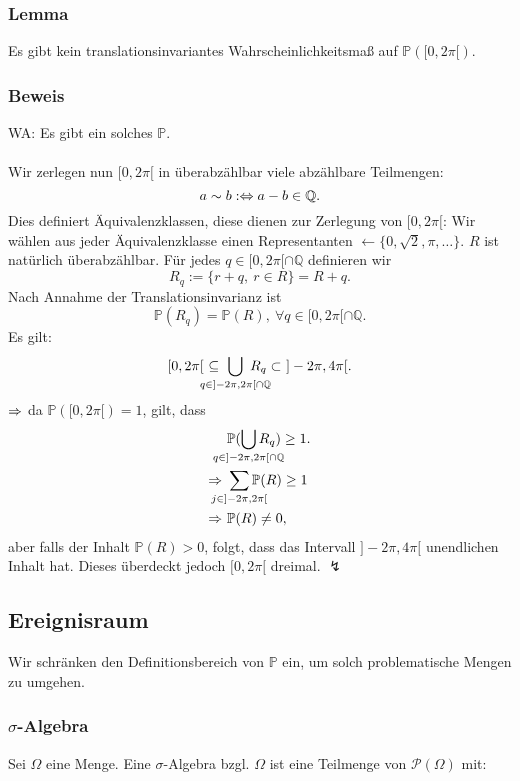 \subsubsection{Lemma}
Es gibt kein translationsinvariantes Wahrscheinlichkeitsma\ss{} auf $\mathbb{P}([0,2\pi[)$.
\subsubsection{Beweis}
WA: Es gibt ein solches $\mathbb{P}$.
\\~\\
Wir zerlegen nun $[0,2\pi[$ in \"uberabz\"ahlbar viele abz\"ahlbare Teilmengen:
\[
a\sim b:\Leftrightarrow a-b\in\mathbb{Q}.
\]
Dies definiert \"Aquivalenzklassen, diese dienen zur Zerlegung von $[0,2\pi[$:
Wir w\"ahlen aus jeder \"Aquivalenzklasse einen Representanten $\leftarrow\{0,\sqrt{2},\pi,\ldots\}$. $R$ ist nat\"urlich \"uberabz\"ahlbar. F\"ur jedes $q\in[0,2\pi[\cap\mathbb{Q}$ definieren wir
\[
R_q:=\{r+q,\ r\in R\}=R+q.
\]
Nach Annahme der Translationsinvarianz ist
\[
\mathbb{P}(R_q)=\mathbb{P}(R),\ \forall q\in[0,2\pi[\cap\mathbb{Q}.
\]
Es gilt:
\[
[0,2\pi[\ \subseteq\ \bigcup_{\mathclap{q\in]-2\pi,2\pi[\cap\mathbb{Q}}}\ R_q\subset\ ]-2\pi,4\pi[.
\]
$\Rightarrow$ da $\mathbb{P}([0,2\pi[)=1$, gilt, dass
\begin{align*}
    &\mathbb{P}(\bigcup_{\mathclap{q\in]-2\pi,2\pi[\cap\mathbb{Q}}}R_q)\geq1.\\
    \RA\ &\sum_{\mathclap{j\in]-2\pi,2\pi[}}\mathbb{P}(R)\geq1\\
    \RA\ &\mathbb{P}(R)\neq0,
\end{align*}
aber falls der Inhalt $\mathbb{P}(R)>0$, folgt, dass das Intervall $]-2\pi,4\pi[$ unendlichen Inhalt hat. Dieses \"uberdeckt jedoch $[0,2\pi[$ dreimal. $\lightning$
\subsection{Ereignisraum}
Wir schr\"anken den Definitionsbereich von $\mathbb{P}$ ein, um solch problematische Mengen zu umgehen. 
\subsubsection{$\sigma$-Algebra}
Sei $\Omega$ eine Menge. Eine $\sigma$-Algebra bzgl. $\Omega$ ist eine Teilmenge von $\mathcal{P}(\Omega)$ mit:
